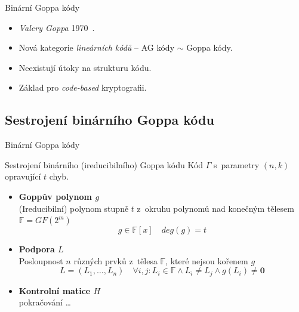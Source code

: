 \documentclass{beamer}
\begin{document}
\begin{frame}{Binární Goppa kódy}
    \begin{itemize}

        \item \emph{Valery Goppa} 1970~\cite{Goppa}.
        \item Nová kategorie \emph{lineárních kódů} -- AG kódy $\sim$ Goppa kódy.

            \pause
        \item Neexistují útoky na strukturu kódu.

            \pause
        \item Základ pro \emph{code-based} kryptografii.

    \end{itemize}
\end{frame}

\subsection{Sestrojení binárního Goppa kódu}
\begin{frame}{Binární Goppa kódy}

    \begin{block}{Sestrojení binárního (ireducibilního) Goppa kódu}
        Kód $\Gamma$ s~parametry $(n,k)$ opravující $t$ chyb.
        \begin{itemize}

        \pause
            \item \textbf{Goppův polynom $g$} \\
                (Ireducibilní) polynom stupně $t$ z~okruhu polynomů nad
                konečným tělesem $\mathbb F = GF(2^m)$
                $$ g \in \mathbb F [x] \quad deg(g) = t $$

        \pause
            \item \textbf{Podpora $L$} \\
                Posloupnost $n$ různých prvků z~tělesa $\mathbb F$, které
                nejsou kořenem $g$
                $$
                    L = \left( L_1, \ldots, L_n \right) \quad \forall i,j : L_i \in
                    \mathbb{F} \land L_i \neq L_j \land g(L_i) \neq \mathbf{0}
                $$

        \pause
            \item \textbf{Kontrolní matice $H$} \\
                pokračování \ldots
        \end{itemize}
    \end{block}

\end{frame}
\end{document}
